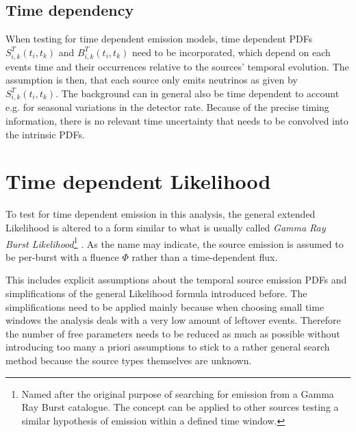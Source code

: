 \subsection{Time dependency}
When testing for time dependent emission models, time dependent PDFs $S_{i,k}^T(t_i, t_k)$ and $B_{i,k}^T(t_i, t_k)$ need to be incorporated, which depend on each events time and their occurrences relative to the sources' temporal evolution.
The assumption is then, that each source only emits neutrinos as given by $S_{i,k}^T(t_i, t_k)$.
The background can in general also be time dependent to account e.g. for seasonal variations in the detector rate.
Because of the precise timing information, there is no relevant time uncertainty that needs to be convolved into the intrinsic PDFs.


\section{Time dependent Likelihood}
To test for time dependent emission in this analysis, the general extended Likelihood is altered to a form similar to what is usually called \emph{Gamma Ray Burst Likelihood}\footnote{Named after the original purpose of searching for emission from a Gamma Ray Burst catalogue. The concept can be applied to other sources testing a similar hypothesis of emission within a defined time window.} .
As the name may indicate, the source emission is assumed to be per-burst with a fluence $\Phi$ rather than a time-dependent flux.

This includes explicit assumptions about the temporal source emission PDFs and simplifications of the general Likelihood formula introduced before.
The simplifications need to be applied mainly because when choosing small time windows the analysis deals with a very low amount of leftover events.
Therefore the number of free parameters needs to be reduced as much as possible without introducing too many a priori assumptions to stick to a rather general search method because the source types themselves are unknown.

